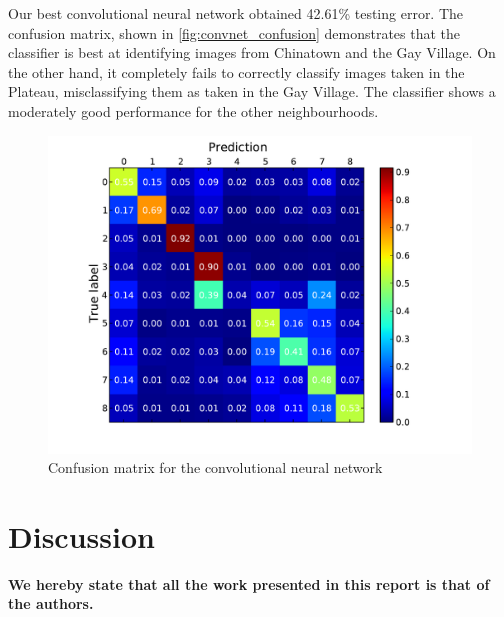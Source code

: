 \documentclass{acm_proc_article-sp}
\begin{document}
Our best convolutional neural network obtained 42.61\% testing error. The confusion matrix, shown in \ref{fig:convnet_confusion} demonstrates that the classifier is best at identifying images from Chinatown and the Gay Village. On the other hand, it completely fails to correctly classify images taken in the Plateau, misclassifying them as taken in the Gay Village. The classifier shows a moderately good performance for the other neighbourhoods.

\begin{figure}[h!]
\includegraphics[width=\linewidth]{convnet_confusion.pdf}
		\caption{Confusion matrix for the convolutional neural network}
		\label{fig:convnet_trainvsvalid}
\end{figure}

\section{Discussion}%


{\bfseries We hereby state that all the work presented in this report is that of the authors.}



\end{document}
